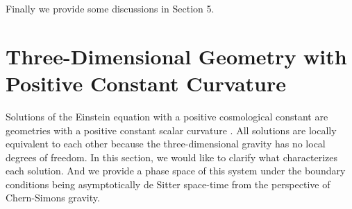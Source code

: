 \documentclass[a4paper,11pt]{article}
\begin{document}
Finally we provide some discussions in Section 5.

\section{Three-Dimensional Geometry with Positive Constant Curvature}
Solutions of the Einstein equation with a positive cosmological constant 
\coordHE{} are geometries with a positive constant scalar curvature \coordHE{}.
All solutions are locally equivalent to each other 
because the three-dimensional gravity has no local degrees of freedom.
In this section, we would like to clarify what characterizes 
each solution.
And we provide a phase space of this system under the boundary conditions 
being asymptotically de Sitter space-time from the perspective of 
Chern-Simons gravity.
\end{document}
